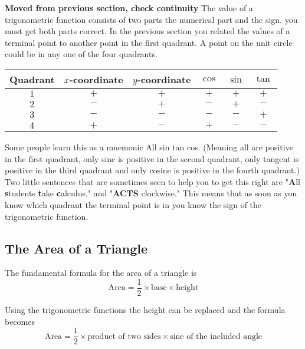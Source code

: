 \textbf{Moved from previous section, check continuity}
The value of a trigonometric function consists of two parts the numerical part and the sign. you must get both parts correct. In the previous section you related the values of a terminal point to another point in the first quadrant. A point on the unit circle could be in any one of the four quadrants. 

\qquad \qquad \qquad \qquad
\begin{tabular}[c]{|c|c|c|c|c|c|}\hline
	Quadrant  & $x$-coordinate  & $y$-coordinate  & $\cos $  & $\sin $  & $\tan $  \\
	\hline
	$1$  & $ +$  & $ +$  & $ +$  & $ +$  & $ +$  \\
	\hline
	$2$  & $ -$  & $ +$  & $ -$  & $ +$  & $ -$  \\
	\hline
	$3$  & $ -$  & $ -$  & $ -$  & $ -$  & $ +$  \\
	\hline
	$4$  & $ +$  & $ -$  & $ +$  & $ -$  & $ -$  \\
	\hline
\end{tabular}

Some people learn this as a mnemonic All sin tan cos. (Meaning all are positive in the first quadrant, only sine is positive in the second quadrant, only tangent is positive in the third quadrant and only cosine is positive in the fourth quadrant.) Two little sentences that are sometimes seen to help you to get this right are "\textbf{A}ll \textbf{s}tudents \textbf{t}ake \textbf{c}alculus," and "\textbf{ACTS} clockwise." This means that as soon as you know which quadrant the terminal point is in you know the sign of the trigonometric function.

\subsection*{The Area of a Triangle}
The fundamental formula for the area of a triangle is
\begin{equation*}\text{Area} =\frac{1}{2} \times \text{base} \times \text{height}
\end{equation*}

Using the trigonometric functions the height can be replaced and the formula becomes
\begin{equation*}\text{Area} =\frac{1}{2} \times \text{product of two sides} \times \text{sine of the included angle}
\end{equation*}

